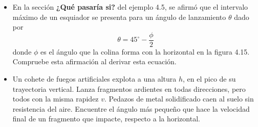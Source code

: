 \documentclass[11pt,a4paper]{article}
\begin{document}
\begin{itemize}
    \item[\textbf{52.}] En la sección \textbf{¿Qué pasaría si?} del ejemplo 4.5, se afirmó que el intervalo máximo de un esquiador se presenta para un ángulo de lanzamiento $\theta$ dado por
    $$ \theta = 45^\circ - \frac{\phi}{2} $$
    donde $\phi$ es el ángulo que la colina forma con la horizontal en la figura 4.15. Compruebe esta afirmación al derivar esta ecuación.
    \vspace*{7cm}

    \item[\textbf{53.}] Un cohete de fuegos artificiales explota a una altura $h$, en el pico de su trayectoria vertical. Lanza fragmentos ardientes en todas direcciones, pero todos con la misma rapidez $v$. Pedazos de metal solidificado caen al suelo sin resistencia del aire. Encuentre el ángulo más pequeño que hace la velocidad final de un fragmento que impacte, respecto a la horizontal.
    \vspace*{7cm}
\end{itemize}
\end{document}
